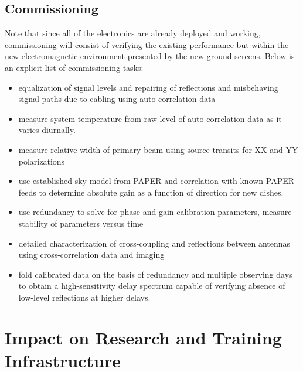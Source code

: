 \documentclass[preprint]{aastex}
\begin{document}
\vspace{-0.25in}
\subsection{Commissioning}
\vspace{-6pt}
Note that since all of the electronics are already deployed and working, commissioning will consist of verifying the existing performance but within the new electromagnetic environment presented by the new ground screens.  Below is
an explicit list of commissioning tasks:
\begin{itemize}[noitemsep,nolistsep]
\item equalization of signal levels and repairing of reflections and misbehaving signal paths due to cabling using auto-correlation data 
\item measure system temperature from raw level of auto-correlation data as it varies diurnally.
\item measure relative width of primary beam using source transits for XX and YY polarizations 
\item use established sky model from PAPER and correlation with known PAPER feeds to 
determine absolute gain as a function of direction for new dishes. 
\item use redundancy to solve for phase and gain calibration parameters, measure stability of parameters versus 
time 
\item detailed characterization of cross-coupling and reflections between antennas using cross-correlation data and imaging 
\item fold calibrated data on the basis of redundancy and multiple observing days to obtain a high-sensitivity delay spectrum capable of verifying absence of low-level reflections at higher delays. 
\end{itemize}

\vspace{-0.25in}
\section{Impact on Research and Training Infrastructure}
\vspace{-6pt}

\end{document}
